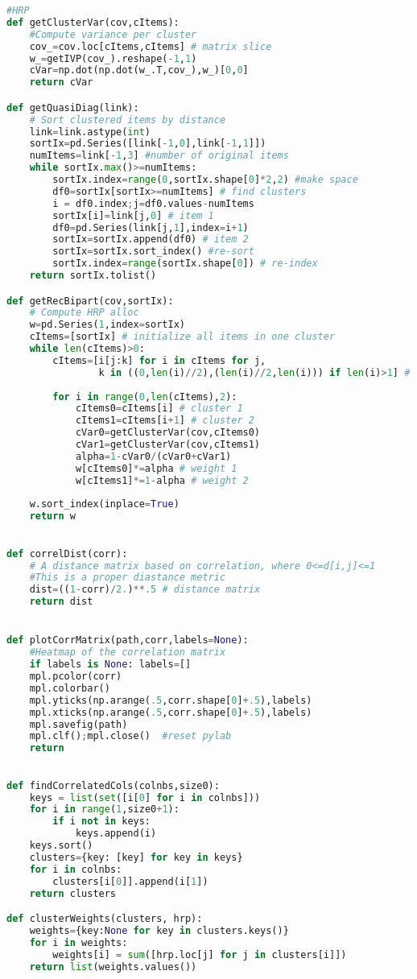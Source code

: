 \begin{lstlisting}[language=Python]
#HRP
def getClusterVar(cov,cItems):
    #Compute variance per cluster
    cov_=cov.loc[cItems,cItems] # matrix slice
    w_=getIVP(cov_).reshape(-1,1)
    cVar=np.dot(np.dot(w_.T,cov_),w_)[0,0]
    return cVar

def getQuasiDiag(link):
    # Sort clustered items by distance
    link=link.astype(int)
    sortIx=pd.Series([link[-1,0],link[-1,1]])
    numItems=link[-1,3] #number of original items
    while sortIx.max()>=numItems:
        sortIx.index=range(0,sortIx.shape[0]*2,2) #make space
        df0=sortIx[sortIx>=numItems] # find clusters
        i = df0.index;j=df0.values-numItems
        sortIx[i]=link[j,0] # item 1
        df0=pd.Series(link[j,1],index=i+1)
        sortIx=sortIx.append(df0) # item 2
        sortIx=sortIx.sort_index() #re-sort
        sortIx.index=range(sortIx.shape[0]) # re-index
    return sortIx.tolist()

def getRecBipart(cov,sortIx):
    # Compute HRP alloc
    w=pd.Series(1,index=sortIx)
    cItems=[sortIx] # initialize all items in one cluster
    while len(cItems)>0:
        cItems=[i[j:k] for i in cItems for j,
                k in ((0,len(i)//2),(len(i)//2,len(i))) if len(i)>1] # bi-section
        
        for i in range(0,len(cItems),2):
            cItems0=cItems[i] # cluster 1
            cItems1=cItems[i+1] # cluster 2
            cVar0=getClusterVar(cov,cItems0)
            cVar1=getClusterVar(cov,cItems1)
            alpha=1-cVar0/(cVar0+cVar1)
            w[cItems0]*=alpha # weight 1
            w[cItems1]*=1-alpha # weight 2
            
    w.sort_index(inplace=True)
    return w
    

def correlDist(corr):
    # A distance matrix based on correlation, where 0<=d[i,j]<=1
    #This is a proper diastance metric
    dist=((1-corr)/2.)**.5 # distance matrix
    return dist


def plotCorrMatrix(path,corr,labels=None):
    #Heatmap of the correlation matrix
    if labels is None: labels=[]
    mpl.pcolor(corr)
    mpl.colorbar()
    mpl.yticks(np.arange(.5,corr.shape[0]+.5),labels)
    mpl.xticks(np.arange(.5,corr.shape[0]+.5),labels)
    mpl.savefig(path)
    mpl.clf();mpl.close()  #reset pylab
    return

    
def findCorrelatedCols(colnbs,size0):
    keys = list(set([i[0] for i in colnbs]))
    for i in range(1,size0+1):
        if i not in keys:
            keys.append(i)
    keys.sort()
    clusters={key: [key] for key in keys}
    for i in colnbs:
        clusters[i[0]].append(i[1])
    return clusters

def clusterWeights(clusters, hrp):
    weights={key:None for key in clusters.keys()}
    for i in weights:
        weights[i] = sum([hrp.loc[j] for j in clusters[i]])
    return list(weights.values())
    
    
\end{lstlisting}

